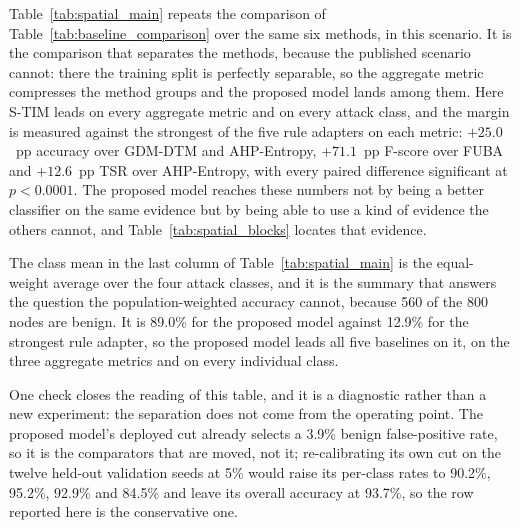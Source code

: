 \documentclass[notspecified,article,submit,moreauthors]{Definitions/mdpi}
\begin{document}
Table~\ref{tab:spatial_main} repeats the comparison of Table~\ref{tab:baseline_comparison} over the same six methods, in this scenario. It is the comparison that separates the methods, because the published scenario cannot: there the training split is perfectly separable, so the aggregate metric compresses the method groups and the proposed model lands among them. Here S-TIM leads on every aggregate metric and on every attack class, and the margin is measured against the strongest of the five rule adapters on each metric: $+25.0$~pp accuracy over GDM-DTM and AHP-Entropy, $+71.1$~pp F-score over FUBA and $+12.6$~pp TSR over AHP-Entropy, with every paired difference significant at $p<0.0001$. The proposed model reaches these numbers not by being a better classifier on the same evidence but by being able to use a kind of evidence the others cannot, and Table~\ref{tab:spatial_blocks} locates that evidence.

The class mean in the last column of Table~\ref{tab:spatial_main} is the equal-weight average over the four attack classes, and it is the summary that answers the question the population-weighted accuracy cannot, because 560 of the 800 nodes are benign. It is 89.0\% for the proposed model against 12.9\% for the strongest rule adapter, so the proposed model leads all five baselines on it, on the three aggregate metrics and on every individual class.

One check closes the reading of this table, and it is a diagnostic rather than a new experiment: the separation does not come from the operating point. The proposed model's deployed cut already selects a 3.9\% benign false-positive rate, so it is the comparators that are moved, not it; re-calibrating its own cut on the twelve held-out validation seeds at 5\% would raise its per-class rates to 90.2\%, 95.2\%, 92.9\% and 84.5\% and leave its overall accuracy at 93.7\%, so the row reported here is the conservative one.
\end{document}
